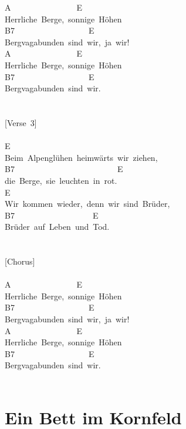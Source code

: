 \documentclass[]{book}
\let\stdsection\section
\renewcommand\section{\clearpage\stdsection}
\begin{document}
A~~~~~~~~~~~~~~~~E\\
Herrliche~Berge,~sonnige~Höhen\\
B7~~~~~~~~~~~~~~~~~~E\\
Bergvagabunden~sind~wir,~ja~wir!\\
A~~~~~~~~~~~~~~~~E\\
Herrliche~Berge,~sonnige~Höhen\\
B7~~~~~~~~~~~~~~~~~~E\\
Bergvagabunden~sind~wir.\\
~\\
~\\
{[}Verse~3{]}\\
~\\
E~~\\
Beim~Alpenglühen~heimwärts~wir~ziehen,\\
B7~~~~~~~~~~~~~~~~~~~~~~~~~E\\
die~Berge,~sie~leuchten~in~rot.\\
E~~~~~~~~~~~~~~~~~~~~~\\
Wir~kommen~wieder,~denn~wir~sind~Brüder,\\
B7~~~~~~~~~~~~~~~~~~~E\\
Brüder~auf~Leben~und~Tod.\\
~\\
~\\
{[}Chorus{]}\\
~\\
A~~~~~~~~~~~~~~~~E\\
Herrliche~Berge,~sonnige~Höhen\\
B7~~~~~~~~~~~~~~~~~~E\\
Bergvagabunden~sind~wir,~ja~wir!\\
A~~~~~~~~~~~~~~~~E\\
Herrliche~Berge,~sonnige~Höhen\\
B7~~~~~~~~~~~~~~~~~~E\\
Bergvagabunden~sind~wir.\\
~\\

\hypertarget{ein-bett-im-kornfeld}{%
\section{Ein Bett im Kornfeld}\label{ein-bett-im-kornfeld}}
\end{document}
